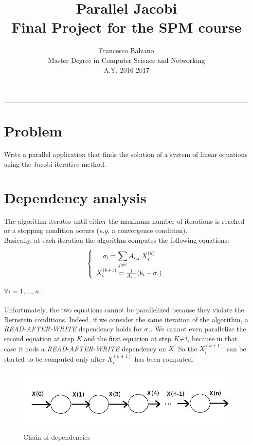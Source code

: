\documentclass{article}
\title{ \textbf {\vspace{0.1cm}\Huge Parallel Jacobi\\ \vspace{0.3cm}}
 Final Project for the SPM course \vspace{0.5cm}\\}
\date{\vspace{1.0cm}}
\author{ \Large Francesco Balzano \vspace{0.3cm}\\ 
\Large Master Degree in Computer Science and Networking \vspace{0.4cm} \\
\Large A.Y. 2016-2017 
}
\begin{document}
  \maketitle
  \noindent\rule{18cm}{0.4pt}
  \tableofcontents
  \newpage

\clearpage
\setcounter{page}{2}
  
\section{Problem}
Write a parallel application that finds the solution of a system of linear equations using the Jacobi iterative method. 
\section{Dependency analysis} \label{dep_an}
The algorithm iterates until either the maximum number of iterations is reached or a stopping condition occurs (\textit{e.g.} a convergence condition). \\
Basically, at each iteration the algorithm computes the following equations:
\[
\left\{ 
\begin{array}{c}
\sigma\textsubscript{i} = \displaystyle\sum_{j \neq i}^{} A_{i,j} \: X_{j}^{(k)}       \\
X_{i}^{(k+1)}  = \frac{1}{A_{i,i}} (b_{i} - \sigma\textsubscript{i})                    \\ 
\end{array}
\right. 
\]

$\forall i = 1, ... , n $. \\ \\

Unfortunately, the two equations cannot be parallelized because they violate the Bernstein conditions. Indeed, if we consider the same iteration of the algorithm, a \textit{READ-AFTER-WRITE} dependency holds for $\sigma\textsubscript{i}$. We cannot even parallelize the second equation at step \textit{K} and the first equation at step \textit{K+1}, because in that case it hods a \textit{READ-AFTER-WRITE} dependency on $X$. So the $X_{i}^{(k+1)}$ can be started to be computed only after $X_{i}^{(k+1)}$ has been computed. 

\begin{figure}[h]
\centering
\includegraphics[scale=0.43]{dependency_chain}
\caption{Chain of dependencies}
\label{fig:dep_chain}
\end{figure}     
\end{document}
